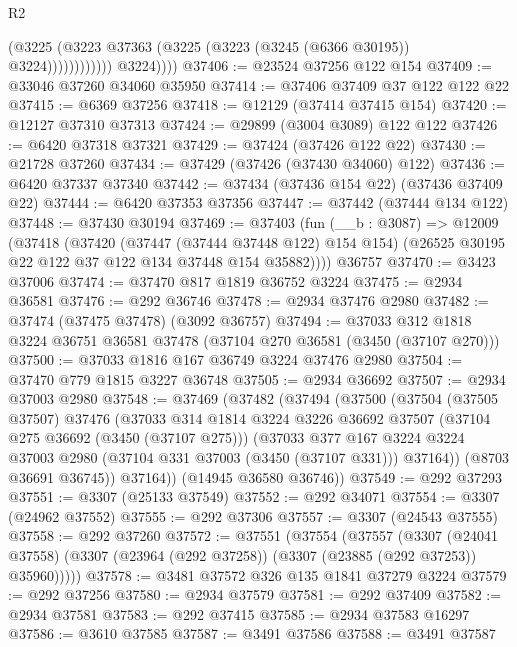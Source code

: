 \begin{lexlean}{R2}
\begin{coremodule}
                            (@3225
                              (@3223 @37363 (@3225 (@3223 (@3245 (@6366 @30195)) @3224))))))))))))
            @3224))))
@37406 := @23524 @37256 @122 @154
@37409 := @33046 @37260 @34060 @35950
@37414 := @37406 @37409 @37 @122 @122 @22
@37415 := @6369 @37256
@37418 := @12129 (@37414 @37415 @154)
@37420 := @12127 @37310 @37313
@37424 := @29899 (@3004 @3089) @122 @122
@37426 := @6420 @37318 @37321
@37429 := @37424 (@37426 @122 @22)
@37430 := @21728 @37260
@37434 := @37429 (@37426 (@37430 @34060) @122)
@37436 := @6420 @37337 @37340
@37442 := @37434 (@37436 @154 @22) (@37436 @37409 @22)
@37444 := @6420 @37353 @37356
@37447 := @37442 (@37444 @134 @122)
@37448 := @37430 @30194
@37469 := @37403
    (fun (__b : @3087) =>
    @12009
      (@37418
        (@37420
          (@37447 (@37444 @37448 @122) @154 @154)
          (@26525 @30195 @22 @122 @37 @122 @134 @37448 @154 @35882))))
    @36757
@37470 := @3423 @37006
@37474 := @37470 @817 @1819 @36752 @3224
@37475 := @2934 @36581
@37476 := @292 @36746
@37478 := @2934 @37476 @2980
@37482 := @37474 (@37475 @37478) (@3092 @36757)
@37494 := @37033 @312 @1818 @3224 @36751 @36581 @37478 (@37104 @270 @36581 (@3450 (@37107 @270)))
@37500 := @37033 @1816 @167 @36749 @3224 @37476 @2980
@37504 := @37470 @779 @1815 @3227 @36748
@37505 := @2934 @36692
@37507 := @2934 @37003 @2980
@37548 := @37469
    (@37482
      (@37494
        (@37500
          (@37504
            (@37505 @37507)
            @37476
            (@37033
              @314
              @1814
              @3224
              @3226
              @36692
              @37507
              (@37104 @275 @36692 (@3450 (@37107 @275)))
              (@37033
                @377
                @167
                @3224
                @3224
                @37003
                @2980
                (@37104 @331 @37003 (@3450 (@37107 @331)))
                @37164))
            (@8703 @36691 @36745))
          @37164))
      (@14945 @36580 @36746))
@37549 := @292 @37293
@37551 := @3307 (@25133 @37549)
@37552 := @292 @34071
@37554 := @3307 (@24962 @37552)
@37555 := @292 @37306
@37557 := @3307 (@24543 @37555)
@37558 := @292 @37260
@37572 := @37551
    (@37554
      (@37557
        (@3307
          (@24041 @37558)
          (@3307 (@23964 (@292 @37258)) (@3307 (@23885 (@292 @37253)) @35960)))))
@37578 := @3481 @37572 @326 @135 @1841 @37279 @3224
@37579 := @292 @37256
@37580 := @2934 @37579
@37581 := @292 @37409
@37582 := @2934 @37581
@37583 := @292 @37415
@37585 := @2934 @37583 @16297
@37586 := @3610 @37585
@37587 := @3491 @37586
@37588 := @3491 @37587

\end{coremodule}
\end{lexlean}
